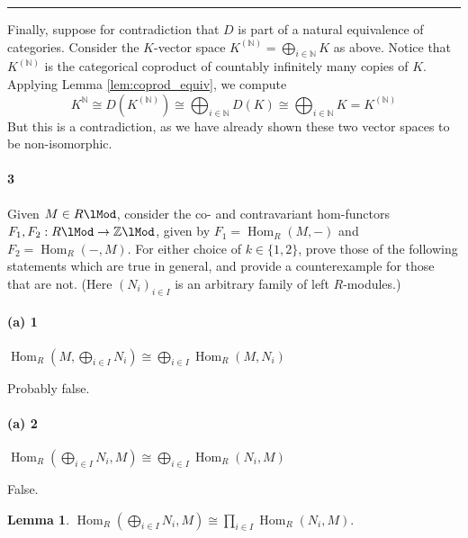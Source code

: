 \documentclass[12pt]{article}
\newlength{\myparskip}
\newenvironment{fullbox}{\begin{lrbox}{\savefullbox}\begin{minipage}{\dimexpr\textwidth-2\fboxsep\relax}\setlength{\parskip}{\myparskip}}{\end{minipage}\end{lrbox}\framebox[\textwidth]{\usebox{\savefullbox}}}
\newenvironment{pbox}[1][]{\begin{fullbox}\def\temp{#1}\ifx\temp\empty\else\paragraph{#1}\phantom{}\fi}{\end{fullbox}}
\theoremstyle{definition}
\newtheorem{lemma}{Lemma}
\newcommand{\N}{\mathbb{N}}
\newcommand{\Z}{\mathbb{Z}}
\newcommand{\<}{\langle}
\renewcommand{\>}{\rangle}
\newcommand{\iso}{\cong}
\renewcommand{\_}[1]{{_{#1}}}
\DeclareMathOperator{\Hom}{Hom}
\begin{document}
\rule{\textwidth}{0.4pt}

Finally, suppose for contradiction that $D$ is part of a natural equivalence of categories.
Consider the $K$-vector space $K^{(\N)} = \bigoplus_{i \in \N} K$ as above.
Notice that $K^{(\N)}$ is the categorical coproduct of countably infinitely many copies of $K$.
Applying Lemma \ref{lem:coprod_equiv}, we compute
\[
    K^{\N}
        \iso D(K^{(\N)}) 
        \iso \bigoplus_{i \in \N} D(K) 
        \iso \bigoplus_{i \in \N} K
        = K^{(\N)}
\]
But this is a contradiction, as we have already shown these two vector spaces to be non-isomorphic.





\newpage
\begin{pbox}[3]
    Given $M \in R\lMod$, consider the co- and contravariant hom-functors $F_1, F_2 : R\lMod \to \Z\lMod$, given by $F_1 = \Hom_R(M, -)$ and $F_2 = \Hom_R(-, M)$. For either choice of $k \in \{1, 2\}$, prove those of the following statements which are true in general, and provide a counterexample for those that are not. (Here $(N_i)_{i \in I}$ is an arbitrary family of left $R$-modules.)
\end{pbox}





\begin{pbox}[(a) 1]
    $\Hom_R(M, \bigoplus_{i\in I} N_i) \iso \bigoplus_{i\in I} \Hom_R(M, N_i)$
\end{pbox}

Probably false.



\begin{pbox}[(a) 2]
    $\Hom_R(\bigoplus_{i\in I} N_i, M) \iso \bigoplus_{i\in I} \Hom_R(N_i, M)$
\end{pbox}

False.

\begin{lemma}\label{lem:co_hom_coprod}
    $\Hom_R(\bigoplus_{i \in I} N_i, M) \iso \prod_{i \in I} \Hom_R(N_i, M)$.
\end{lemma}
\end{document}
